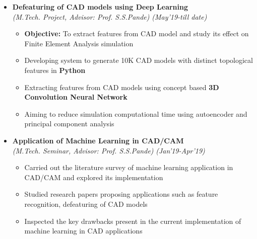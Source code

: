 \documentclass[a4paper,10pt]{article}
\begin{document}
\begin{itemize}%
\item \textbf{Defeaturing of CAD models using Deep Learning}\\
\emph{(M.Tech. Project, Advisor: Prof. S.S.Pande)} \hfill \emph{(May'19-till date)}
	\begin{itemize}[noitemsep,nolistsep]
	\item \textbf{Objective:} To extract features from CAD model and study its effect on Finite Element Analysis simulation
	\item Developing system to generate 10K CAD models with distinct topological features in \textbf{Python}
	\item Extracting features from CAD models using concept based \textbf{3D Convolution Neural Network}
	\item Aiming to reduce simulation computational time using autoencoder and principal component analysis
    \end{itemize}
    
\item \textbf{Application of Machine Learning in CAD/CAM} \\
\emph{(M.Tech. Seminar, Advisor: Prof. S.S.Pande)} \hfill \emph{(Jan'19-Apr'19)}
	\begin{itemize}[noitemsep,nolistsep]
    \item Carried out the literature survey of machine learning application in CAD/CAM and explored its implementation %
     \item Studied research papers proposing applications such as feature recognition, defeaturing of CAD models
    \item Inspected the key drawbacks present in the current implementation of machine learning in CAD applications
	\end{itemize}
\end{itemize}
\end{document}
